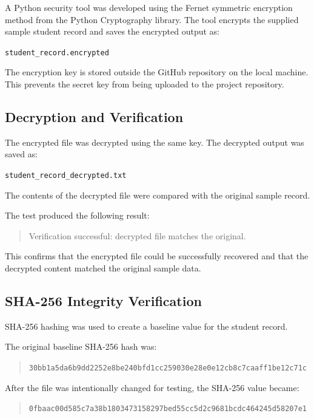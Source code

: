 \documentclass[12pt,a4paper]{article}
\begin{document}
A Python security tool was developed using the Fernet symmetric encryption method from the Python Cryptography library. The tool encrypts the supplied sample student record and saves the encrypted output as:

\begin{center}
\texttt{student\_record.encrypted}
\end{center}

The encryption key is stored outside the GitHub repository on the local machine. This prevents the secret key from being uploaded to the project repository.

\subsection{Decryption and Verification}

The encrypted file was decrypted using the same key. The decrypted output was saved as:

\begin{center}
\texttt{student\_record\_decrypted.txt}
\end{center}

The contents of the decrypted file were compared with the original sample record.

The test produced the following result:

\begin{quote}
Verification successful: decrypted file matches the original.
\end{quote}

This confirms that the encrypted file could be successfully recovered and that the decrypted content matched the original sample data.

\subsection{SHA-256 Integrity Verification}

SHA-256 hashing was used to create a baseline value for the student record.

The original baseline SHA-256 hash was:

\begin{quote}
\texttt{30bb1a5da6b9dd2252e8be240bfd1cc259030e28e0e12cb8c7caaff1be12c71c}
\end{quote}

After the file was intentionally changed for testing, the SHA-256 value became:

\begin{quote}
\texttt{0fbaac00d585c7a38b1803473158297bed55cc5d2c9681bcdc464245d58207e1}
\end{quote}
\end{document}
